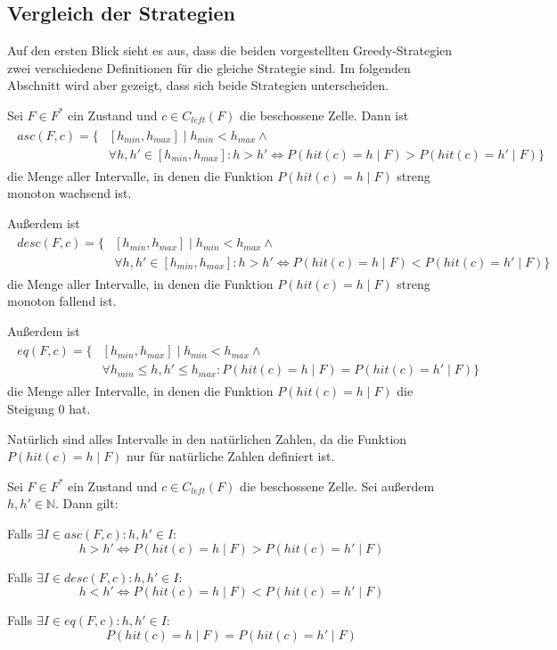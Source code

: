 \documentclass[a4paper,12pt]{llncs}
\newcommand{\N}{{\mathbb{N}}}
\numberwithin{equation}{section}
\begin{document}
\subsection{Vergleich der Strategien}
Auf den ersten Blick sieht es aus, dass die beiden vorgestellten Greedy-Strategien zwei verschiedene Definitionen für die gleiche Strategie sind. Im folgenden Abschnitt wird aber gezeigt, dass sich beide Strategien unterscheiden.

\begin{definition}
Sei $F\in F^*$ ein Zustand und $c \in C_{left}(F)$ die beschossene Zelle.
Dann ist
\begin{align}
\begin{split}
asc(F, c)=\{&[h_{min}, h_{max}] \mid h_{min} < h_{max} \wedge \\ 
&\forall h,h' \in [h_{min}, h_{max}]  \colon h > h' \Leftrightarrow P(hit(c)=h \mid F) > P(hit(c)=h' \mid F)\}
\nonumber
\end{split}
\end{align}
die Menge aller Intervalle, in denen die Funktion $P(hit(c)=h \mid F)$ streng monoton wachsend ist.

Außerdem ist
\begin{align}
\begin{split}
desc(F, c)=\{&[h_{min}, h_{max}] \mid h_{min} < h_{max} \wedge \\ 
&\forall h,h' \in [h_{min}, h_{max}]  \colon h > h' \Leftrightarrow P(hit(c)=h \mid F) < P(hit(c)=h' \mid F)\}
\nonumber
\end{split}
\end{align}
die Menge aller Intervalle, in denen die Funktion $P(hit(c)=h \mid F)$ streng monoton fallend ist.

Außerdem ist
\begin{align}
\begin{split}
eq(F, c)=\{&[h_{min}, h_{max}] \mid h_{min} < h_{max} \wedge \\ 
&\forall h_{min} \leq h,h' \leq h_{max} \colon P(hit(c)=h \mid F) = P(hit(c)=h' \mid F)\}
\nonumber
\end{split}
\end{align}
die Menge aller Intervalle, in denen die Funktion $P(hit(c)=h \mid F)$ die Steigung 0 hat.

Natürlich sind alles Intervalle in den natürlichen Zahlen, da die Funktion $P(hit(c)=h \mid F)$ nur für natürliche Zahlen definiert ist.
\end{definition}

\begin{lemma}
Sei $F\in F^*$ ein Zustand und $c \in C_{left}(F)$ die beschossene Zelle.
Sei außerdem $h,h' \in \N$.
Dann gilt:

Falls $\exists I \in asc(F, c) \colon h,h' \in I$:
\[
h > h' \Leftrightarrow P(hit(c)=h \mid F) > P(hit(c)=h' \mid F)
\]

Falls $\exists I \in desc(F, c) \colon h,h' \in I$:
\[
h < h' \Leftrightarrow P(hit(c)=h \mid F) < P(hit(c)=h' \mid F)
\]

Falls $\exists I \in eq(F, c) \colon h,h' \in I$:
\[
P(hit(c)=h \mid F) = P(hit(c)=h' \mid F)
\]

\end{lemma}
\end{document}
